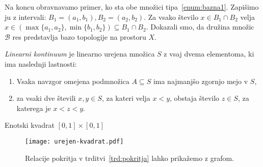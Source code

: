 \documentclass[../TG_magistrsko_delo_sections.tex]{subfiles}
\begin{document}
Na koncu obravnavamo primer, ko sta obe množici tipa~\ref{enum:bazna1}. Zapišimo ju z intervali: $B_1 = (a_1, b_1), B_2 =(a_2, b_2)$. Za vsako število $x \in B_1 \cap B_2$ velja $x \in (\max\{a_1, a_2\}, \min\{b_1, b_2\}) \subseteq B_1 \cap B_2$. Dokazali smo, da družina množic $\mathcal{B}$ res predstavlja bazo topologije na prostoru $X$.

\begin{definicija}
\emph{Linearni kontinuum} je linearno urejena množica $S$ z vsaj dvema elementoma, ki ima naslednji lastnosti:
\begin{enumerate}
\item Vsaka navzgor omejena podmnožica $A \subseteq S$ ima najmanjšo zgornjo mejo v $S$,\label{enum:L1}
\item za vsaki dve števili $x, y \in S$, za kateri velja $x<y$, obstaja število $z \in S$, za katerega je $x<z<y$.\label{enum:L2}
\end{enumerate}
\end{definicija}

\begin{primer}
Enotski kvadrat $[0, 1] \times [0, 1]$ 
\end{primer}

\begin{figure}[h]
  \centering
  \texttt{[image: urejen-kvadrat.pdf]}
  \caption[Primer vektorske slike.]{Relacije pokritja v trditvi~\ref{trd:pokritja} lahko prikažemo z grafom.}
  \label{fig:varsavski_lok}
\end{figure}
\end{document}
